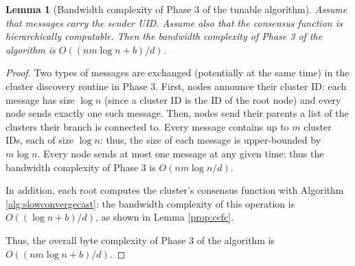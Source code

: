 \documentclass[letterpaper,10pt,conference]{ieeeconf}
\newtheorem{lemma}[theorem]{Lemma}
\begin{document}
\begin{lemma}[Bandwidth complexity of Phase 3 of the tunable algorithm]
\label{lemma:hybrid3ub}
Assume that messages carry the sender UID. Assume also that the consensus function is hierarchically computable. Then the bandwidth complexity of Phase 3 of the algorithm is $O((nm\log n+b)/d)$.
\end{lemma}
\begin{proof}
Two types of messages are exchanged (potentially at the same time) in the cluster discovery routine in Phase 3. First, nodes announce their cluster ID: each message has size $\log n$ (since a cluster ID is the ID of the root node) and every node sends exactly one such message. Then, nodes send their parents a list of the clusters their branch is connected to. Every message contains up to $m$ cluster IDs, each of size $\log n$: thus, the size of each message is upper-bounded by $m\log n$. Every node sends at most one message at any given time: thus the bandwidth complexity of Phase 3 is $O(nm\log n/d)$.

In addition, each root computes the cluster's consensus function with Algorithm \ref{alg:slowconvergecast}: the bandwidth complexity of this operation is $O((\log n +b)/d)$, as shown in Lemma \ref{prop:ccfc}.

Thus, the overall byte complexity of Phase 3 of the algorithm is $O((nm\log n+b)/d)$.
\end{proof}
\end{document}
